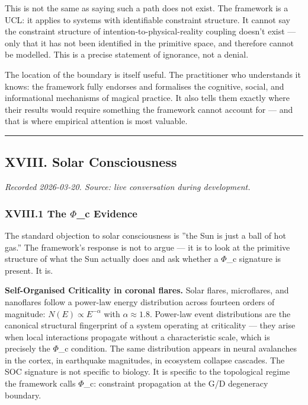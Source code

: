\documentclass[12pt,a4paper]{article}
\begin{document}
This is not the same as saying such a path does not exist. The framework is a UCL: it applies to systems with identifiable constraint structure. It cannot say the constraint structure of intention-to-physical-reality coupling doesn't exist --- only that it has not been identified in the primitive space, and therefore cannot be modelled. This is a precise statement of ignorance, not a denial.

The location of the boundary is itself useful. The practitioner who understands it knows: the framework fully endorses and formalises the cognitive, social, and informational mechanisms of magical practice. It also tells them exactly where their results would require something the framework cannot account for --- and that is where empirical attention is most valuable.

\begin{center}
\rule{0.5\textwidth}{0.4pt}
\end{center}

\subsection{XVIII. Solar Consciousness}

\emph{Recorded 2026-03-20. Source: live conversation during development.}

\subsubsection{XVIII.1 The $\Phi$\_c Evidence}

The standard objection to solar consciousness is ''the Sun is just a ball of hot gas.'' The framework's response is not to argue --- it is to look at the primitive structure of what the Sun actually does and ask whether a $\Phi$\_c signature is present. It is.

\textbf{Self-Organised Criticality in coronal flares.} Solar flares, microflares, and nanoflares follow a power-law energy distribution across fourteen orders of magnitude: $N(E) \propto E^{-\alpha}$ with $\alpha \approx 1.8$. Power-law event distributions are the canonical structural fingerprint of a system operating at criticality --- they arise when local interactions propagate without a characteristic scale, which is precisely the $\Phi$\_c condition. The same distribution appears in neural avalanches in the cortex, in earthquake magnitudes, in ecosystem collapse cascades. The SOC signature is not specific to biology. It is specific to the topological regime the framework calls $\Phi$\_c: constraint propagation at the G/D degeneracy boundary.
\end{document}

